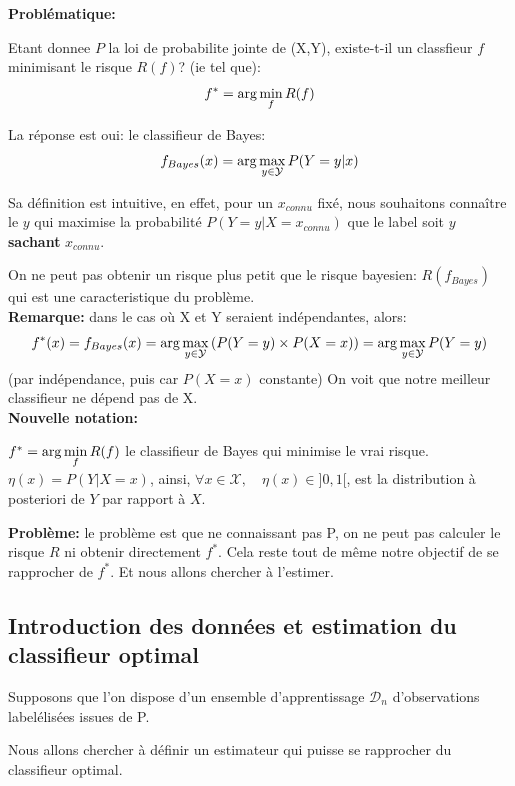 \documentclass[a4paper]{article}
\theoremstyle{plain}
\begin{document}
\textbf{Problématique: }


Etant donnee $P$ la loi de probabilite jointe de (X,Y), existe-t-il un classfieur $f$ minimisant le risque $R(f)$? (ie tel que):
$$f^{\ast} = {\rm arg} \displaystyle\min_{f} R(f)  $$

La réponse est oui: le classifieur de Bayes:
$$f_{Bayes}(x) = {\rm arg} \displaystyle\max_{y \in \mathcal{Y}} P(Y=y|x)$$

Sa définition est intuitive, en effet, pour un $x_{connu}$ fixé, nous souhaitons connaître le $y$ qui maximise la probabilité $P(Y=y|X=x_{connu})$ que le label soit $y$ \textbf{sachant} $x_{connu}$.

On ne peut pas obtenir un risque plus petit que le risque
bayesien: $R(f_{Bayes})$ qui est une caracteristique du problème.\\

\textbf{Remarque:} dans le cas où X et Y seraient indépendantes, alors: 
$$f^{\ast}(x) = f_{Bayes}(x) = {\rm arg} \displaystyle\max_{y \in \mathcal{Y}} \left(P(Y=y)\times P(X=x) \right) = {\rm arg} \displaystyle\max_{y \in \mathcal{Y}} P(Y=y) $$ 
(par indépendance, puis car $P(X=x)$ constante) On voit que notre meilleur classifieur ne dépend pas de X.\\

\textbf{Nouvelle notation:}

\begin{outline}

\1 $f^{\ast} = {\rm arg} \displaystyle\min_{f} R(f) $ le classifieur de Bayes qui minimise le vrai risque.
\1 $\eta (x) = P(Y|X=x)$, ainsi, $ \forall x \in \mathcal{X}, \quad \eta(x) \in ]0,1[$, est la distribution à posteriori de $Y$ par rapport à $X$.

\end{outline}

\textbf{Problème:} le problème est que ne connaissant pas P, on ne peut pas calculer le risque $R$ ni obtenir directement $f^{\ast}$. Cela reste tout de même notre objectif de se rapprocher de $f^{\ast}$. Et nous allons chercher à l'estimer.

\subsection{Introduction des données et estimation du classifieur optimal}
Supposons que l'on dispose d'un ensemble d'apprentissage $\mathcal{D}_n$ d'observations labelélisées issues de P.  

Nous allons chercher à définir un estimateur qui puisse se rapprocher du classifieur optimal. 
\end{document}
